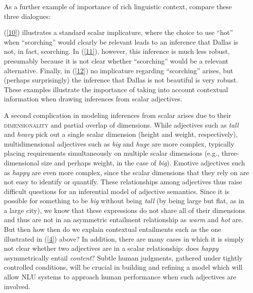 \documentclass[10pt]{article}
\begin{document}
As a further example of importance of rich linguistic context, compare these three dialogues: 
 \vspace{-.1in}
\begin{multicols}{3}
\end{multicols}
 \vspace{-.1in}
(\ref{10}) illustrates a standard scalar implicature, where the choice to use ``hot'' when ``scorching'' would clearly be relevant leads to an inference that Dallas is not, in fact, scorching. In (\ref{11}), however, this inference is much less robust, presumably because it is not clear whether ``scorching'' would be a relevant alternative. Finally, in (\ref{12}) no implicature regarding ``scorching'' arises, but (perhaps surprisingly) the inference that Dallas is not beautiful is very robust. These examples illustrate the importance of taking into account contextual information when drawing inferences from scalar adjectives.

A second complication in modeling inferences from scalar arises due to their \textsc{dimensionality} and partial overlap of dimensions. While adjectives such as \emph{tall} and \emph{heavy} pick out a single scalar dimension (height and weight, respectively), multidimensional adjectives such as \emph{big} and \emph{huge} are more complex, typically placing requirements simultaneously on multiple scalar dimensions (e.g., three-dimensional size and perhaps weight, in the case of \emph{big}). Emotive adjectives such as \emph{happy} are even more complex, since the scalar dimensions that they rely on are not easy to identify or quantify. These relationships among adjectives thus raise difficult questions for an inferential model of adjective semantics. Since it is possible for something to be \emph{big} without being \emph{tall} (by being large but flat, as in a large city), we know that these expressions do not share all of their dimensions and thus are not in an asymmetric entailment relationship as \emph{warm} and \emph{hot} are. But then how then do we explain contextual entailments such as the one illustrated in (\ref{4}) above? In addition, there are many cases in which it is simply not clear whether two adjectives are in a scalar relationship: does \emph{happy} asymmetrically entail \emph{content}? Subtle human judgments, gathered under tightly controlled conditions, will be crucial in building and refining a model which will allow NLU systems to approach human performance when such adjectives are involved.
\end{document}
